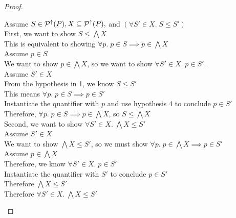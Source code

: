 \begin{proof}
\begin{tabbedproof}
\oo Assume $S \in \mathcal{P}^{\uparrow}({P}), X \subseteq \mathcal{P}^{\uparrow}({P}),$ and   
           $(\forall S' \in X.\; S \leq S')$ \\
\ooo First, we want to show $S \leq \bigwedge X$ \\
\oooo This is equivalent to showing $\forall p.\; p \in S \implies p \in \bigwedge X$ \\
\oooo Assume $p \in S$ \\
\ooooo We want to show $p \in \bigwedge X$, so we want to show $\forall S' \in X.\; p \in S'$. \\
\ooooo Assume $S' \in X$ \\
\oooooo From the hypothesis in 1, we know $S \leq S'$ \\
\oooooo This means $\forall p.\; p \in S \implies p \in S'$ \\
\oooooo Instantiate the quantifier with $p$ and use hypothesis 4 to conclude $p \in S'$ \\
\oooo Therefore, $\forall p.\; p \in S \implies p \in \bigwedge X$, so $S \leq \bigwedge X$ \\[1em]
\ooo Second, we want to show $\forall S' \in X.\; \bigwedge X \leq S'$ \\
\ooo Assume $S' \in X$ \\
\oooo We want to show $\bigwedge X \leq S'$, so we must show $\forall p.\; p \in \bigwedge X \implies p \in S'$ \\
\oooo Assume $p \in \bigwedge X$ \\
\ooooo Therefore, we know $\forall S' \in X.\; p \in S'$ \\
\ooooo Instantiate the quantifier with $S'$ to conclude $p \in S'$ \\
\oooo Therefore $\bigwedge X \leq S'$ \\
\ooo Therefore $\forall S' \in X.\; \bigwedge X \leq S'$ 
\end{tabbedproof}
\end{proof}



